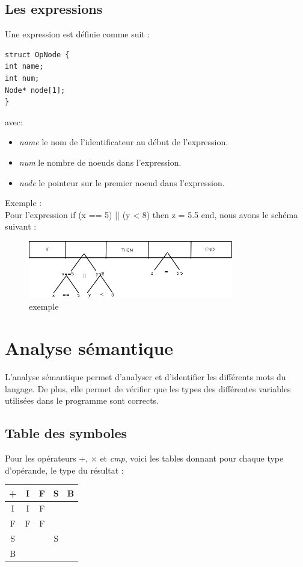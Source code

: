 \documentclass{article}
\begin{document}
\subsection{Les expressions}

Une expression est définie comme suit : 
\begin{verbatim}
struct OpNode {
int name;
int num;
Node* node[1];
}
\end{verbatim}
 avec: 
\begin{itemize}
\item \emph{name} le nom de l'identificateur au début de l'expression. 
\item \emph{num} le nombre de noeuds dans l'expression.
\item \emph{node} le pointeur sur le premier noeud dans l'expression.
\end{itemize}

\noindent Exemple : \\
\noindent Pour l'expression if (x == 5) || (y < 8) then z = 5.5 end, nous avons le schéma suivant : 
\begin{figure}[!h]
\centering
\includegraphics[width=0.8\textwidth]{exemple.png}
\caption{exemple}
\end{figure}

\newpage
\section{Analyse sémantique}
L'analyse sémantique permet d'analyser et d'identifier les différents mots du langage. De plus, elle permet de vérifier que les types des différentes variables utilisées dans le programme sont corrects.
 
\subsection{Table des symboles}
Pour les opérateurs +, $\times$ et \emph{cmp}, voici les tables donnant pour chaque type d'opérande, le type du résultat : \\
\begin{center}
\begin{tabular}{|c|c|c|c|c|}
  \hline
  + & I & F & S & B \\
  \hline
  I & I & F &   &  \\
  \hline
  F & F & F &   & \\
  \hline
  S &   &   & S & \\
  \hline
  B & & & & \\
  \hline
\end{tabular}
\end{center}
\end{document}
